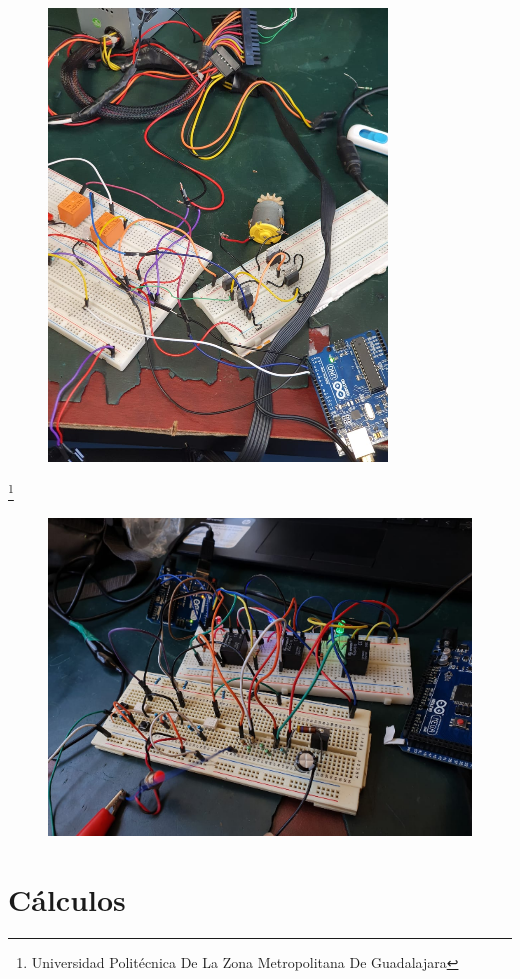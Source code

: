 \documentclass[10pt,a4paper]{article}
\begin{document}
\begin{figure}[hbtp]
\includegraphics[scale=0.5]{5.png} 
\centering
\end{figure}

\footnote{Universidad Politécnica De La Zona Metropolitana De Guadalajara}
\newpage

\begin{figure}[hbtp]
\includegraphics[scale=0.4]{6.png} 
\centering
\end{figure}


\section{Cálculos}
\end{document}
